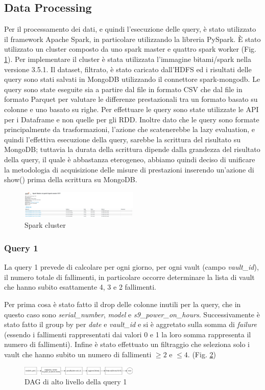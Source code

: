 \documentclass[conference]{IEEEtran}
\begin{document}
\subsection{Data Processing}
Per il processamento dei dati, e quindi l'esecuzione delle query, è stato utilizzato il framework Apache Spark, in particolare utilizzando la libreria PySpark. È stato utilizzato un cluster composto da uno spark master e quattro spark worker (Fig. \ref{fig:spark_cluster}). Per implementare il cluster è stata utilizzata l'immagine bitami/spark nella versione 3.5.1.
Il dataset, filtrato, è stato caricato dall'HDFS ed i risultati delle query sono stati salvati in MongoDB utilizzando il connettore spark-mongodb.
Le query sono state eseguite sia a partire dal file in formato CSV che dal file in formato Parquet per valutare le differenze prestazionali tra un formato basato su colonne e uno basato su righe.
Per effettuare le query sono state utilizzate le API per i Dataframe e non quelle per gli RDD. 
Inoltre dato che le query sono formate principalmente da trasformazioni, l'azione che scatenerebbe la lazy evaluation, e quindi l'effettiva esecuzione della query, sarebbe la scrittura del risultato su MongoDB; tuttavia la durata della scrittura dipende dalla grandezza del risultato della query, il quale è abbastanza eterogeneo, abbiamo quindi deciso di unificare la metodologia di acquisizione delle misure di prestazioni inserendo un'azione di show() prima della scrittura su MongoDB.
\begin{figure}[H]
    \centering
    \includegraphics[width=0.5\textwidth]{./res/spark_cluster.png}
    \caption{Spark cluster}
    \label{fig:spark_cluster}
\end{figure}
\subsubsection{Query 1}
La query 1 prevede di calcolare per ogni giorno, per ogni vault (campo \textit{vault\_id}), il numero totale di fallimenti, in particolare occorre determinare la lista di vault che hanno subito esattamente 4, 3 e 2 fallimenti.

Per prima cosa è stato fatto il drop delle colonne inutili per la query, che in questo caso sono \textit{serial\_number}, \textit{model} e \textit{s9\_power\_on\_hours}. Successivamente è stato fatto il group by per \textit{date} e \textit{vault\_id} e si è aggretato sulla somma di \textit{failure} (essendo i fallimenti rappresentati dai valori 0 e 1 la loro somma rappresenta il numero di fallimenti). Infine è stato effettuato un filtraggio che seleziona solo i vault che hanno subito un numero di fallimenti $\geq2$ e $\leq4$. (Fig. \ref{fig:dag_query1})
\begin{figure}[H]
    \centerline{\includegraphics[width=0.5\textwidth]{res/query1_dag.png}}
    \caption{DAG di alto livello della query 1}
    \label{fig:dag_query1}
\end{figure}
\end{document}

